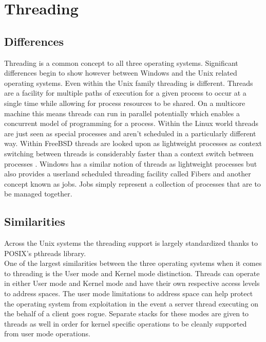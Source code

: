 \documentclass[letterpaper,10pt,draftclsnofoot,onecolumn]{IEEEtran}
\begin{document}
\newpage
\section{Threading}

\subsection{Differences}
Threading is a common concept to all three operating systems. Significant differences begin to show however between Windows and the Unix related operating systems. Even within the Unix family threading is different. Threads are a facility for multiple paths of execution for a given process to occur at a single time while allowing for process resources to be shared. On a multicore machine this means threads can run in parallel potentially which enables a concurrent model of programming for a process. Within the Linux world threads are just seen as special processes and aren’t scheduled in a particularly different way. Within FreeBSD threads are looked upon as lightweight processes as context switching between threads is considerably faster than a context switch between processes \cite{mccusick}. Windows has a similar notion of threads as lightweight processes but also provides a userland scheduled threading facility called Fibers and another concept known as jobs. Jobs simply represent a collection of processes that are to be managed together.\\
\subsection{Similarities}
Across the Unix systems the threading support is largely standardized thanks to POSIX’s pthreads library.\\

One of the largest similarities between the three operating systems when it comes to threading is the User mode and Kernel mode distinction. Threads can operate in either User mode and Kernel mode and have their own respective access levels to address spaces. The user mode limitations to address space can help protect the operating system from exploitation in the event a server thread executing on the behalf of a client goes rogue. Separate stacks for these modes are given to threads as well in order for kernel specific operations to be cleanly supported from user mode operations.\\
\newpage
\end{document}

